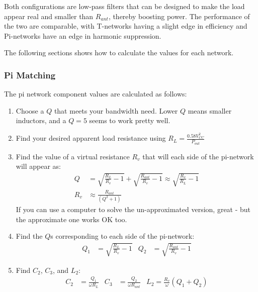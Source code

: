 \documentclass[10pt,letterpaper]{article}
\begin{document}
Both configurations are low-pass filters that can be designed to make the load appear real and smaller than $R_{ant}$, thereby boosting power. The performance of the two are comparable, with T-networks having a slight edge in efficiency and Pi-networks have an edge in harmonic suppression.

The following sections shows how to calculate the values for each network.

\subsubsection{Pi Matching}
The pi network component values are calculated as follows:
\begin{enumerate}
\item Choose a $Q$ that meets your bandwidth need. Lower $Q$ means smaller inductors, and a $Q=5$ seems to work pretty well.
\item Find your desired apparent load resistance using $R_L=\frac{0.58 V_{CC}^2}{P_{out}}$
\item Find the value of a virtual resistance $R_v$ that will each side of the pi-network will appear as:
\begin{align*}
Q&=\sqrt{\frac{R_L}{R_v}-1}+\sqrt{\frac{R_{ant}}{R_v}-1}\approx \sqrt{\frac{R_v}{R_L}-1}\\
R_v&\approx \frac{R_{ant}}{(Q^2+1)}
\end{align*}
If you can use a computer to solve the un-approximated version, great - but the approximate one works OK too.
\item Find the $Q$s corresponding to each side of the pi-network:
\begin{align*}
Q_1 & = \sqrt{\frac{R_L}{R_v}-1} &Q_2 &=\sqrt{\frac{R_{ant}}{R_v}-1}
\end{align*}
\item Find $C_2$, $C_3$, and $L_2$:
\begin{align*}
C_2 &= \frac{Q_1 }{\omega R_L} &C_3 &= \frac{Q_2 }{\omega R_{ant}} & L_2 = \frac{R_v}{\omega} (Q_1+Q_2)
\end{align*}
\end{enumerate}
\end{document}

